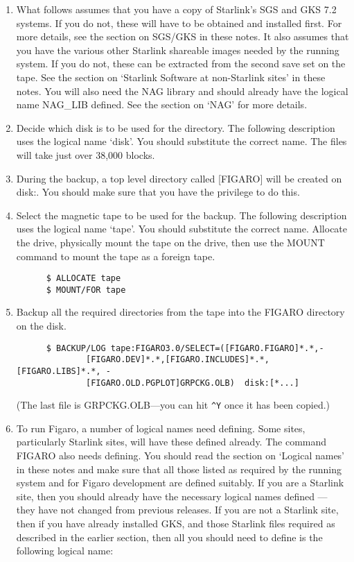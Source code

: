 \begin{enumerate}

\item What follows assumes that you have a copy of  Starlink's  SGS and  GKS 
7.2  systems.  If you do not, these will have to be obtained and installed
first. For  more  details,  see  the section  on SGS/GKS in these notes.  It
also assumes that you have the various other Starlink shareable  images  needed 
by the  running  system. If you do not, these can be extracted from the second
save set on the tape. See  the  section  on `Starlink  Software  at 
non-Starlink  sites' in these notes. You will also need the NAG library and 
should  already  have the  logical  name NAG\_LIB defined.  See the section on
`NAG' for more details.

\item Decide which disk is to  be  used  for  the  directory. The following 
description  uses  the  logical  name `disk'.  You should substitute the
correct name.  The files will take just over 38,000 blocks.

\item During the backup, a top level directory called [FIGARO] will be  created
on disk:.  You should make sure that you have the privilege to do this.

\item Select the magnetic tape to be  used  for  the  backup. The following 
description  uses  the  logical  name `tape'.  You should substitute the 
correct  name. Allocate  the  drive, physically  mount  the  tape on the
drive, then use the MOUNT command to mount the tape as a foreign tape.

\begin{verbatim}
      $ ALLOCATE tape
      $ MOUNT/FOR tape
\end{verbatim}

\item Backup all the required directories from the  tape  into  the FIGARO
directory on the disk.

\begin{verbatim}
      $ BACKUP/LOG tape:FIGARO3.0/SELECT=([FIGARO.FIGARO]*.*,-
              [FIGARO.DEV]*.*,[FIGARO.INCLUDES]*.*,[FIGARO.LIBS]*.*, -
              [FIGARO.OLD.PGPLOT]GRPCKG.OLB)  disk:[*...]
\end{verbatim}
             
(The last file is GRPCKG.OLB---you can hit \verb+^Y+ once it has been copied.)

\item To run Figaro, a number of logical names need defining.  Some sites, 
particularly  Starlink sites, will have these defined already.  The command
FIGARO also needs defining.  You should read  the  section on `Logical names'
in these notes and make sure that all those listed as required by the running 
system and  for Figaro development are defined suitably.  If you are a Starlink
site, then you should already have  the  necessary logical  names  defined ---
they have not changed from previous releases.  If you are not a Starlink site,
then if  you  have already  installed  GKS, and those Starlink files required
as described in the earlier section, then all you should need to define is the
following logical name:


\end{enumerate}
